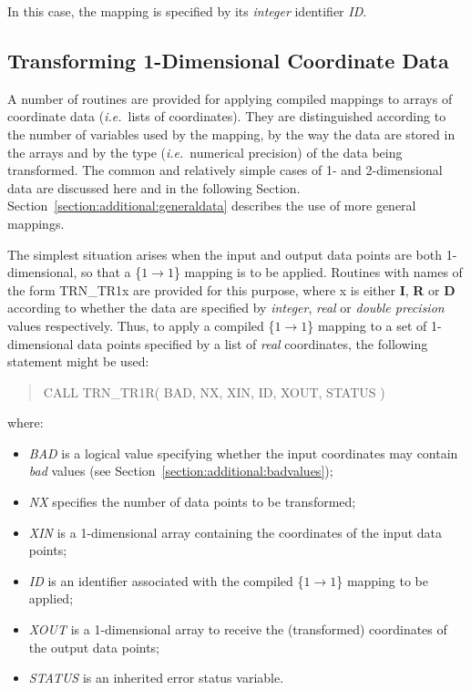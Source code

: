 \documentclass[twoside,nolof,11pt]{starlink}
\providecommand{\name}[1]{\small{#1}}
\providecommand{\fortvar}[1]{\emph{#1}}
\begin{document}
In this case, the mapping is specified by its \emph{integer} identifier
\fortvar{ID}.


\subsection{Transforming 1-Dimensional Coordinate Data}

\label{section:simple:1ddata}

A number of routines are provided for applying compiled mappings to arrays
of coordinate data (\emph{i.e.}\ lists of coordinates).
They are distinguished according to the number of variables used by the
mapping, by the way the data are stored in the arrays and by the type
(\emph{i.e.}\ numerical precision) of the data being transformed.
The common and relatively simple cases of 1- and 2-dimensional data are
discussed here and in the following Section.
Section~\ref{section:additional:generaldata} describes the use of more
general mappings.

The simplest situation arises when the input and output data points are
both 1-dimensional, so that a \mbox{\{$1 \rightarrow 1$\}} mapping is
to be applied.  Routines with names of the form \name{TRN\_TR1x} are
provided for this purpose, where x is either \textbf{I}, \textbf{R} or
\textbf{D} according to whether the data are specified by
\emph{integer}, \emph{real} or \emph{double precision} values
respectively.  Thus, to apply a compiled \mbox{\{$1 \rightarrow 1$\}}
mapping to a set of 1-dimensional data points specified by a list of
\emph{real} coordinates, the following statement might be used:

\begin{quote}
\begin{terminalv}
CALL TRN_TR1R( BAD, NX, XIN, ID, XOUT, STATUS )
\end{terminalv}
\end{quote}

where:

\begin{itemize}

\item \fortvar{BAD} is a logical value specifying whether the input
coordinates may contain \emph{bad} values (see
Section~\ref{section:additional:badvalues});

\item \fortvar{NX} specifies the number of data points to be transformed;

\item \fortvar{XIN} is a 1-dimensional array containing the coordinates of
the input data points;

\item \fortvar{ID} is an identifier associated with the compiled \mbox{\{$1
\rightarrow 1$\}} mapping to be applied;

\item \fortvar{XOUT} is a 1-dimensional array to receive the (transformed)
coordinates of the output data points;

\item \fortvar{STATUS} is an inherited error status variable.

\end{itemize}
\end{document}
